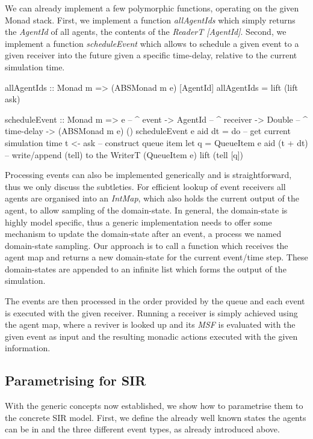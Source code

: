 We can already implement a few polymorphic functions, operating on the given Monad stack. First, we implement a function \textit{allAgentIds} which simply returns the \textit{AgentId} of all agents, the contents of the \textit{ReaderT [AgentId]}. Second, we implement a function \textit{scheduleEvent} which allows to schedule a given event to a given receiver into the future given a specific time-delay, relative to the current simulation time.
 
\begin{HaskellCode}
allAgentIds :: Monad m => (ABSMonad m e) [AgentId]
allAgentIds = lift (lift ask)

scheduleEvent :: Monad m
              => e        -- ^ event
              -> AgentId  -- ^ receiver
              -> Double   -- ^ time-delay
              -> (ABSMonad m e) ()
scheduleEvent e aid dt = do
  -- get current simulation time
  t <- ask
  -- construct queue item
  let q = QueueItem e aid (t + dt)
  -- write/append (tell) to the WriterT (QueueItem e)
  lift (tell [q])
\end{HaskellCode}

Processing events can also be implemented generically and is straightforward, thus we only discuss the subtleties. For efficient lookup of event receivers all agents are organised into an \textit{IntMap}, which also holds the current output of the agent, to allow sampling of the domain-state. In general, the domain-state is highly model specific, thus a generic implementation needs to offer some mechanism to update the domain-state after an event, a process we named domain-state sampling. Our approach is to call a function which receives the agent map and returns a new domain-state for the current event/time step. These domain-states are appended to an infinite list which forms the output of the simulation.

The events are then processed in the order provided by the queue and each event is executed with the given receiver. Running a receiver is simply achieved using the agent map, where a reviver is looked up and its \textit{MSF} is evaluated with the given event as input and the resulting monadic actions executed with the given information.
 
\subsection{Parametrising for SIR}
With the generic concepts now established, we show how to parametrise them to the concrete SIR model. First, we define the already well known states the agents can be in and the three different event types, as already introduced above.

